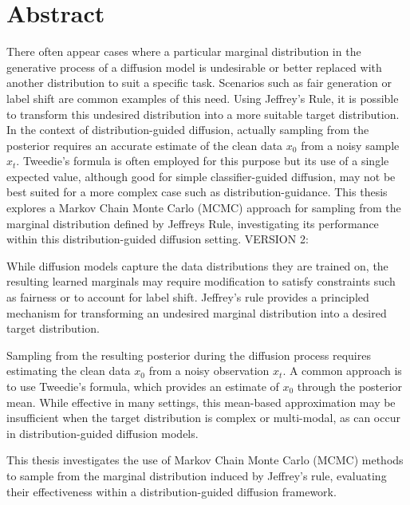 \section*{Abstract}

There often appear cases where a particular marginal distribution in the generative process of a diffusion model is undesirable or better replaced with another distribution to suit a specific task. Scenarios such as fair generation or label shift are common examples of this need. Using Jeffrey's Rule, it is possible to transform this undesired distribution into a more suitable target distribution. In the context of distribution-guided diffusion, actually sampling from the posterior requires an accurate estimate of the clean data $x_0$ from a noisy sample $x_t$. Tweedie's formula is often employed for this purpose but its use of a single expected value, although good for simple classifier-guided diffusion, may not be best suited for a more complex case such as distribution-guidance. This thesis explores a Markov Chain Monte Carlo (MCMC) approach for sampling from the marginal distribution defined by Jeffreys Rule, investigating its performance within this distribution-guided diffusion setting.
VERSION 2:

While diffusion models capture the data distributions they are trained on, the resulting learned marginals may require modification to satisfy constraints such as fairness or to account for label shift. Jeffrey's rule provides a principled mechanism for transforming an undesired marginal distribution into a desired target distribution.

Sampling from the resulting posterior during the diffusion process requires estimating the clean data $x_0$ from a noisy observation $x_t$. A common approach is to use Tweedie's formula, which provides an estimate of $x_0$ through the posterior mean. While effective in many settings, this mean-based approximation may be insufficient when the target distribution is complex or multi-modal, as can occur in distribution-guided diffusion models.

This thesis investigates the use of Markov Chain Monte Carlo (MCMC) methods to sample from the marginal distribution induced by Jeffrey's rule, evaluating their effectiveness within a distribution-guided diffusion framework.

